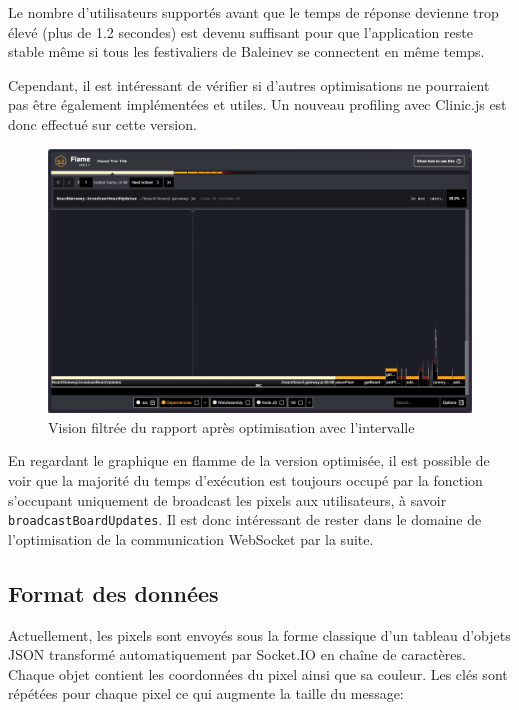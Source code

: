 Le nombre d'utilisateurs supportés avant que le temps de réponse devienne trop élevé (plus de 1.2 secondes) est devenu suffisant pour que l'application reste stable même si tous les festivaliers de Baleinev se connectent en même temps.

Cependant, il est intéressant de vérifier si d'autres optimisations ne pourraient pas être également implémentées et utiles. Un nouveau profiling avec Clinic.js est donc effectué sur cette version.


\begin{figure}[H]
  \centering
  \includegraphics[width=1\textwidth]{./assets/figures/flame/flame2-filtered.png}
  \caption{Vision filtrée du rapport après optimisation avec l'intervalle}
  \label{fig:flame2-filtered}
\end{figure}

En regardant le graphique en flamme de la version optimisée, il est possible de voir que la majorité du temps d'exécution est toujours occupé par la fonction s'occupant uniquement de broadcast les pixels aux utilisateurs, à savoir \texttt{broadcastBoardUpdates}. Il est donc intéressant de rester dans le domaine de l'optimisation de la communication WebSocket par la suite.

\subsection{Format des données}

Actuellement, les pixels sont envoyés sous la forme classique d'un tableau d'objets JSON transformé automatiquement par Socket.IO en chaîne de caractères. Chaque objet contient les coordonnées du pixel ainsi que sa couleur. Les clés sont répétées pour chaque pixel ce qui augmente la taille du message:

